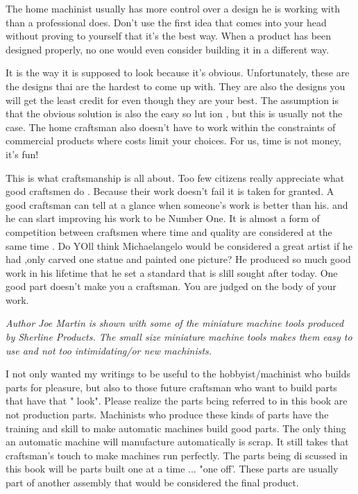 
The home machinist usually has more control over a design he is working with
than a professional does. Don't use the first idea that comes into your head
without proving to yourself that it's the best way. When a product has been
designed properly, no one would even consider building it in a different way.

It is the way it is supposed to look because it's obvious. Unfortunately, these
are the designs thai are the hardest to come up with. They are also the designs
you will get the least credit for even though they are your best. The assumption
is that the obvious solution is also the easy so lut ion , but this is usually
not the case. The home craftsman also doesn't have to work within the
constraints of commercial products where costs limit your choices.
For us, time is not money, it's fun!

This is what craftsmanship is all about. Too few
citizens really appreciate what good craftsmen do .
Because their work doesn't fail it is taken for
granted. A good craftsman can tell at a glance when
someone's work is better than his. and he can slart
improving his work to be Number One. It is almost
a form of competition between craftsmen where time
and quality are considered at the same time . Do YOll
think Michaelangelo would be considered a great
artist if he had ,only carved one statue and painted
one picture? He produced so much good work in
his lifetime that he set a standard that is slill sought
after today. One good part doesn't make you a
craftsman. You are judged on the body of your work.

\bigskip\textit{Author Joe Martin is shown with some of the miniature machine
tools produced by Sherline Products. The small size miniature machine tools
makes them easy to use and not too intimidating/or new machinists.
}\bigskip

I not only wanted my writings to be useful to the
hobbyist/machinist who builds parts for pleasure,
but also to those future craftsman who want to build
parts that have that " look". Please realize the parts
bcing referred to in this book are not production
parts. Machinists who produce these kinds of parts
have the training and skill to make automatic
machines build good parts. The only thing an
automatic machine will manufacture automatically
is scrap. It still takes that craftsman's touch to make
machines run perfectly. The parts being di scussed
in this book will be parts built one at a time ... "one
off'. These parts are usually part of another assembly
that would be considered the final product.

